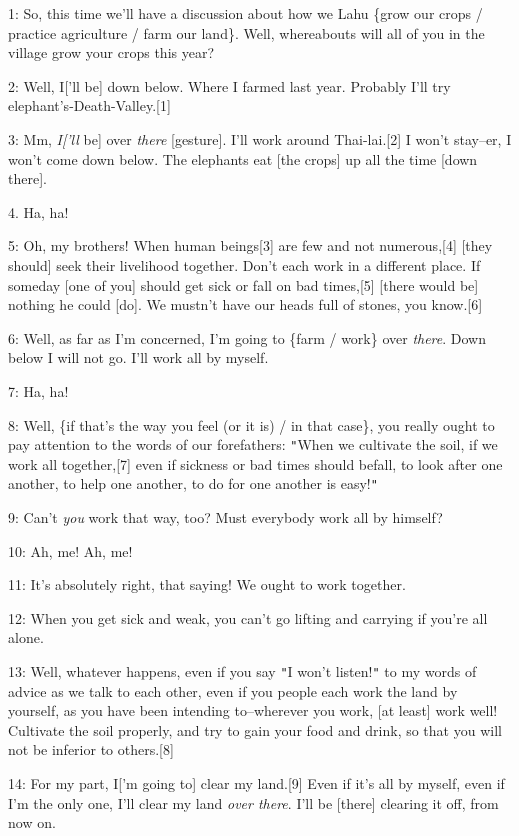 
1: So, this time we'll have a discussion about how we Lahu \{grow our crops / practice
agriculture / farm our land\}. Well, whereabouts will all of you in the village
grow your crops this year?

2: Well, I['ll be] down below. Where I farmed last year. Probably I'll try elephant's-Death-Valley.[1]

3: Mm, \textit{I['ll} be] over \textit{there} [gesture]. I'll work around Thai-lai.[2]
I won't stay--er, I won't come down below. The elephants eat [the crops] up all
the time [down there].

4. Ha, ha!

5: Oh, my brothers! When human beings[3] are few and not numerous,[4] [they should]
seek their livelihood together. Don't each work in a different place. If someday
[one of you] should get sick or fall on bad times,[5] [there would be] nothing
he could [do]. We mustn't have our heads full of stones, you know.[6]

6: Well, as far as I'm concerned, I'm going to \{farm / work\} over \textit{there}.
Down below I will not go. I'll work all by myself.

7: Ha, ha!

8: Well, \{if that's the way you feel (or it is) / in that case\}, you really ought
to pay attention to the words of our forefathers: \texttt{"}When we cultivate the
soil, if we work all together,[7] even if sickness or bad times should befall,
to look after one another, to help one another, to do for one another is easy!\texttt{"}


9: Can't \textit{you} work that way, too? Must everybody work all by himself?

10: Ah, me! Ah, me!

11: It's absolutely right, that saying! We ought to work together.

12: When you get sick and weak, you can't go lifting and carrying if you're all
alone.

13: Well, whatever happens, even if you say \texttt{"}I won't listen!\texttt{"}
to my words of advice as we talk to each other, even if you people each work the
land by yourself, as you have been intending to--wherever you work, [at least]
work well! Cultivate the soil properly, and try to gain your food and drink, so
that you will not be inferior to others.[8]

14: For my part, I['m going to] clear my land.[9] Even if it's all by myself, even
if I'm the only one, I'll clear my land \textit{over there}. I'll be [there] clearing
it off, from now on.

